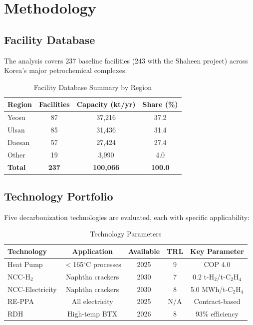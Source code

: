 \documentclass[12pt,a4paper]{article}
\begin{document}
\section{Methodology}

\subsection{Facility Database}

The analysis covers 237 baseline facilities (243 with the Shaheen project) across Korea's major petrochemical complexes.

\begin{table}[H]
\centering
\caption{Facility Database Summary by Region}
\begin{tabular}{lccc}
\toprule
Region & Facilities & Capacity (kt/yr) & Share (\%) \\
\midrule
Yeosu & 87 & 37,216 & 37.2 \\
Ulsan & 85 & 31,436 & 31.4 \\
Daesan & 57 & 27,424 & 27.4 \\
Other & 19 & 3,990 & 4.0 \\
\midrule
\textbf{Total} & \textbf{237} & \textbf{100,066} & \textbf{100.0} \\
\bottomrule
\end{tabular}
\end{table}

\subsection{Technology Portfolio}

Five decarbonization technologies are evaluated, each with specific applicability:

\begin{table}[H]
\centering
\caption{Technology Parameters}
\begin{tabular}{lcccc}
\toprule
Technology & Application & Available & TRL & Key Parameter \\
\midrule
Heat Pump & $<$165$^\circ$C processes & 2025 & 9 & COP 4.0 \\
NCC-H$_2$ & Naphtha crackers & 2030 & 7 & 0.2 t-H$_2$/t-C$_2$H$_4$ \\
NCC-Electricity & Naphtha crackers & 2030 & 8 & 5.0 MWh/t-C$_2$H$_4$ \\
RE-PPA & All electricity & 2025 & N/A & Contract-based \\
RDH & High-temp BTX & 2026 & 8 & 93\% efficiency \\
\bottomrule
\end{tabular}
\end{table}
\end{document}
